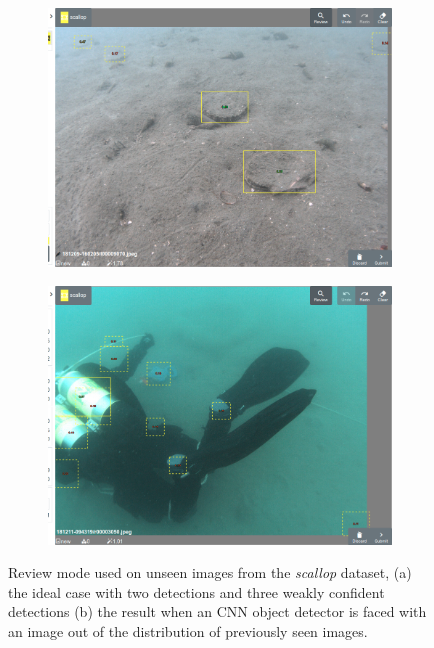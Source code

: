 \begin{figure}[thb]
\centering
\begin{subfigure}[t]{0.5\linewidth}
  \includegraphics[width=1.0\linewidth]{figures/annotation/scallop/review_mode.png}
  \caption{}
  \label{fig:scallop_review_a}
\end{subfigure}%
\begin{subfigure}[t]{0.5\linewidth}
  \includegraphics[width=1.0\linewidth]{figures/annotation/scallop/diver.png}
  \caption{}
  \label{fig:scallop_diver}
\end{subfigure}
\caption{Review mode used on unseen images from the \emph{scallop} dataset, (a) the ideal case with two detections and three weakly confident detections (b) the result when an \gls{CNN} object detector is faced with an image out of  the distribution of previously seen images. }
\label {fig:scallop_review}
\end{figure}



